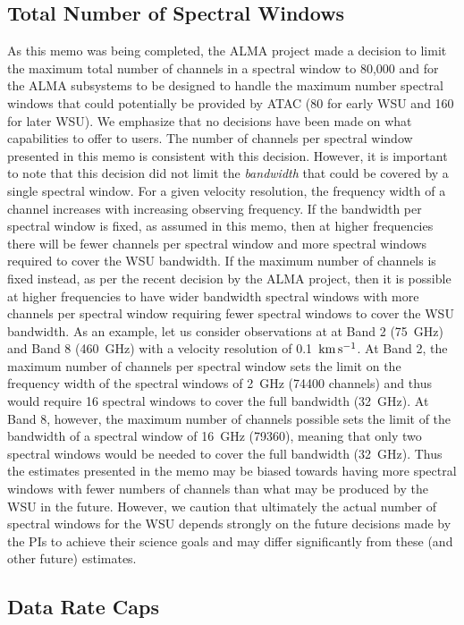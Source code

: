 \documentclass[preprint]{aastex631}
\newcommand{\kms}{\ensuremath{\rm{ km \, s^{-1}}}}
\begin{document}
\subsection{Total Number of Spectral Windows} \label{sec:discussion_nspw}


As this memo was being completed, the ALMA project made a decision to limit the maximum total number of channels in a spectral window to 80,000 and for the ALMA subsystems to be designed to handle  the maximum number spectral windows that could potentially be provided by ATAC (80 for early WSU and 160 for later WSU). We emphasize that no decisions have been made on what capabilities to offer to users. The number of channels per spectral window presented in this memo is consistent with this decision. However, it is important to note that this decision did not limit the {\it bandwidth} that could be covered by a single spectral window. For a given velocity resolution, the frequency width of a channel increases with increasing observing frequency. If the bandwidth per spectral window is fixed, as assumed in this memo, then at higher frequencies there will be fewer channels per spectral window and more spectral windows  required to cover the WSU bandwidth. If the maximum number of channels is fixed instead, as per the recent decision by the ALMA project, then it is possible at higher frequencies to have wider bandwidth spectral windows with more channels per spectral window requiring fewer spectral windows to cover the WSU bandwidth. As an example, let us consider observations at at Band 2 (75~GHz) and Band 8 (460~GHz) with a velocity resolution of 0.1~\kms. At Band 2, the maximum number of channels per spectral window sets the limit on the frequency width of the spectral windows of 2~GHz (74400 channels) and thus would require 16 spectral windows to cover the full bandwidth (32~GHz). At Band 8, however, the maximum number of channels possible sets the limit of the bandwidth of a spectral window of 16~GHz (79360), meaning that only two spectral windows would be needed to cover the full bandwidth (32~GHz).  Thus the estimates presented in the memo may be biased towards having more spectral windows with fewer numbers of channels than what may be produced by the WSU in the future. However, we caution that ultimately the actual number of spectral windows for the WSU depends strongly on the future decisions made by the PIs to achieve their science goals and may differ significantly from these (and other future) estimates.

\subsection{Data Rate Caps} \label{sec:discussion_dataratecaps}
\end{document}
